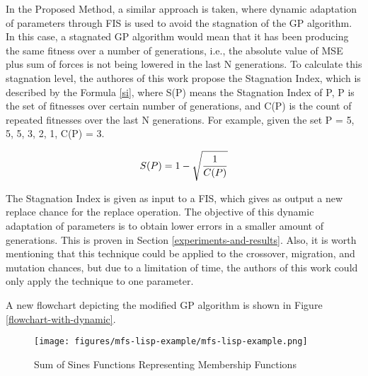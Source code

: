 \documentclass[12pt,journal,draftcls,onecolumn]{IEEEtran}
\begin{document}
In the Proposed Method, a similar approach is taken, where dynamic adaptation of parameters through FIS is used to avoid the stagnation of the GP algorithm. In this case, a stagnated GP algorithm would mean that it has been producing the same fitness over a number of generations, i.e., the absolute value of MSE plus sum of forces is not being lowered in the last N generations. To calculate this stagnation level, the authores of this work propose the Stagnation Index, which is described by the Formula \ref{si}, where S(P) means the Stagnation Index of P, P is the set of fitnesses over certain number of generations, and C(P) is the count of repeated fitnesses over the last N generations. For example, given the set P = {5, 5, 5, 3, 2, 1}, C(P) = 3.

\begin{equation} \label{si}
S(P) = 1 - \sqrt{1 \over C(P)}
\end{equation}

The Stagnation Index is given as input to a FIS, which gives as output a new replace chance for the replace operation. The objective of this dynamic adaptation of parameters is to obtain lower errors in a smaller amount of generations. This is proven in Section \ref{experiments-and-results}. Also, it is worth mentioning that this technique could be applied to the crossover, migration, and mutation chances, but due to a limitation of time, the authors of this work could only apply the technique to one parameter.

A new flowchart depicting the modified GP algorithm is shown in Figure \ref{flowchart-with-dynamic}.


  
  
  
  
  
  
  
  
  
  
  
  
  
  
  
  
  
  
  
  
  
  
  

\begin{figure}[h!]
\caption{Sum of Sines Functions Representing Membership Functions}
\label{sum-of-sines-mfs}
\begin{center}
\texttt{[image: figures/mfs-lisp-example/mfs-lisp-example.png]}
\end{center}
\end{figure}
\end{document}
